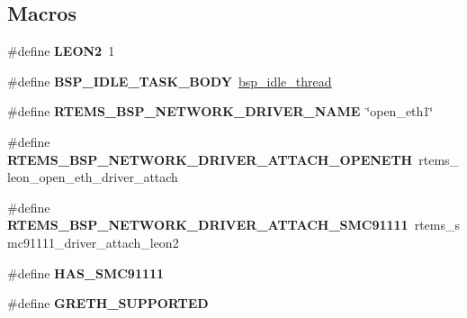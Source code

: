 \subsection*{Macros}
\begin{DoxyCompactItemize}
\item 
\mbox{\label{group__RTEMSBSPsSPARCLEON2_gaceb68b905f5ade1d89f0923aabc6c7cf}} 
\#define {\bfseries L\+E\+O\+N2}~1
\item 
\mbox{\label{group__RTEMSBSPsSPARCLEON2_ga4aa606d0badadcc28e8054cb60f13b56}} 
\#define {\bfseries B\+S\+P\+\_\+\+I\+D\+L\+E\+\_\+\+T\+A\+S\+K\+\_\+\+B\+O\+DY}~\mbox{\hyperlink{group__RTEMSBSPsSPARCLEON3_ga301be7085b80c41a9c5887247003c662}{bsp\+\_\+idle\+\_\+thread}}
\item 
\mbox{\label{group__RTEMSBSPsSPARCLEON2_ga86d4f9aa98431100692e31068070a8df}} 
\#define {\bfseries R\+T\+E\+M\+S\+\_\+\+B\+S\+P\+\_\+\+N\+E\+T\+W\+O\+R\+K\+\_\+\+D\+R\+I\+V\+E\+R\+\_\+\+N\+A\+ME}~\char`\"{}open\+\_\+eth1\char`\"{}
\item 
\mbox{\label{group__RTEMSBSPsSPARCLEON2_ga56ba3db9d91878886566baa96a5d9c10}} 
\#define {\bfseries R\+T\+E\+M\+S\+\_\+\+B\+S\+P\+\_\+\+N\+E\+T\+W\+O\+R\+K\+\_\+\+D\+R\+I\+V\+E\+R\+\_\+\+A\+T\+T\+A\+C\+H\+\_\+\+O\+P\+E\+N\+E\+TH}~rtems\+\_\+leon\+\_\+open\+\_\+eth\+\_\+driver\+\_\+attach
\item 
\mbox{\label{group__RTEMSBSPsSPARCLEON2_gac19c3d15ed91b7280a65680c42fa1500}} 
\#define {\bfseries R\+T\+E\+M\+S\+\_\+\+B\+S\+P\+\_\+\+N\+E\+T\+W\+O\+R\+K\+\_\+\+D\+R\+I\+V\+E\+R\+\_\+\+A\+T\+T\+A\+C\+H\+\_\+\+S\+M\+C91111}~rtems\+\_\+smc91111\+\_\+driver\+\_\+attach\+\_\+leon2
\item 
\mbox{\label{group__RTEMSBSPsSPARCLEON2_gaa30c7825a525b11fdad96521928272c2}} 
\#define {\bfseries H\+A\+S\+\_\+\+S\+M\+C91111}
\item 
\mbox{\label{group__RTEMSBSPsSPARCLEON2_gaad194acfc3dec3fd9aee7417387fbed7}} 
\#define {\bfseries G\+R\+E\+T\+H\+\_\+\+S\+U\+P\+P\+O\+R\+T\+ED}
\item 
\mbox{\label{group__RTEMSBSPsSPARCLEON2_ga9189ceb400b0298ec77c9427e6dfe7b1}} 

\end{DoxyCompactItemize}
